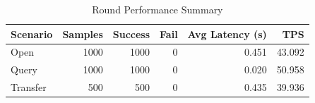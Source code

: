 \begin{table}
\caption{Round Performance Summary}
\label{tab:round_perf}
\begin{tabular}{lrrrrr}
\toprule
Scenario & Samples & Success & Fail & Avg Latency (s) & TPS \\
\midrule
Open & 1000 & 1000 & 0 & 0.451 & 43.092 \\
Query & 1000 & 1000 & 0 & 0.020 & 50.958 \\
Transfer & 500 & 500 & 0 & 0.435 & 39.936 \\
\bottomrule
\end{tabular}
\end{table}
